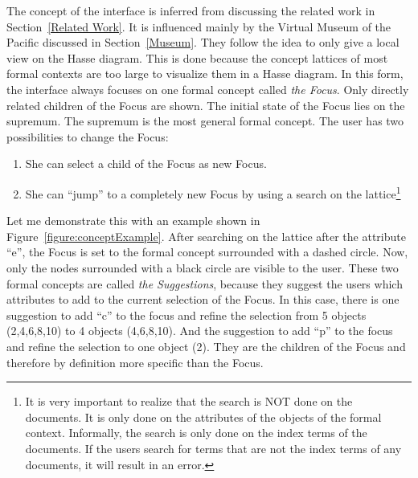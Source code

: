 \documentclass[11pt]{report}
\begin{document}
The concept of the interface is inferred from discussing the related work in Section~\ref{Related Work}. It is influenced mainly by the Virtual Museum of the Pacific discussed in Section~\ref{Museum}. They follow the idea to only give a local view on the Hasse diagram. This is done because the concept lattices of most formal contexts are too large to visualize them in a Hasse diagram. In this form, the interface always focuses on one formal concept called \textit{the Focus}. Only directly related children of the Focus are shown. The initial state of the Focus lies on the supremum. The supremum is the most general formal concept. The user has two possibilities to change the Focus:
\begin{enumerate}
	\item She can select a child of the Focus as new Focus.
	\item She can ``jump'' to a completely new Focus by using a search on the lattice\footnote{It is very important to realize that the search is NOT done on the documents. It is only done on the attributes of the objects of the formal context. Informally, the search is only done on the index terms of the documents. If the users search for terms that are not the index terms of any documents, it will result in an error.}
\end{enumerate}
Let me demonstrate this with an example shown in Figure~\ref{figure:conceptExample}. After searching on the lattice after the attribute ``e'', the Focus is set to the formal concept surrounded with a dashed circle. Now, only the nodes surrounded with a black circle are visible to the user. These two formal concepts are called \textit{the Suggestions}, because they suggest the users which attributes to add to the current selection of the Focus. In this case, there is one suggestion to add ``c'' to the focus and refine the selection from 5 objects (2,4,6,8,10) to 4 objects (4,6,8,10). And the suggestion to add ``p'' to the focus and refine the selection to one object (2). They are the children of the Focus and therefore by definition more specific than the Focus. \\
\end{document}
